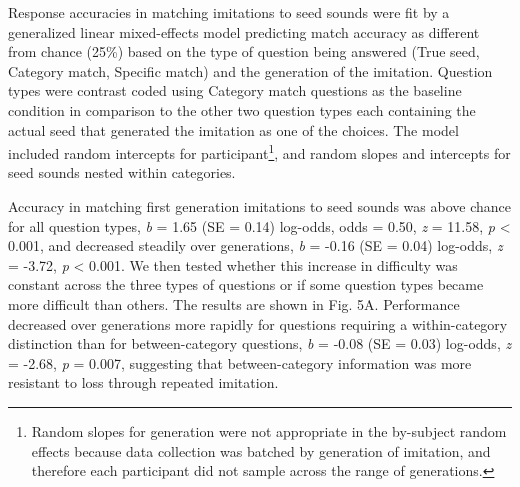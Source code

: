 \documentclass[english,floatsintext,man]{apa6}
\theoremstyle{definition}
\theoremstyle{definition}
\theoremstyle{definition}
\theoremstyle{remark}
\begin{document}
Response accuracies in matching imitations to seed sounds were fit by a
generalized linear mixed-effects model predicting match accuracy as
different from chance (25\%) based on the type of question being
answered (True seed, Category match, Specific match) and the generation
of the imitation. Question types were contrast coded using Category
match questions as the baseline condition in comparison to the other two
question types each containing the actual seed that generated the
imitation as one of the choices. The model included random intercepts
for participant\footnote{Random slopes for generation were not
  appropriate in the by-subject random effects because data collection
  was batched by generation of imitation, and therefore each participant
  did not sample across the range of generations.}, and random slopes
and intercepts for seed sounds nested within categories.

Accuracy in matching first generation imitations to seed sounds was
above chance for all question types, \emph{b} = 1.65 (SE = 0.14)
log-odds, odds = 0.50, \emph{z} = 11.58, \emph{p} \textless{} 0.001, and
decreased steadily over generations, \emph{b} = -0.16 (SE = 0.04)
log-odds, \emph{z} = -3.72, \emph{p} \textless{} 0.001. We then tested
whether this increase in difficulty was constant across the three types
of questions or if some question types became more difficult than
others. The results are shown in Fig. 5A. Performance decreased over
generations more rapidly for questions requiring a within-category
distinction than for between-category questions, \emph{b} = -0.08 (SE =
0.03) log-odds, \emph{z} = -2.68, \emph{p} = 0.007, suggesting that
between-category information was more resistant to loss through repeated
imitation.
\end{document}
